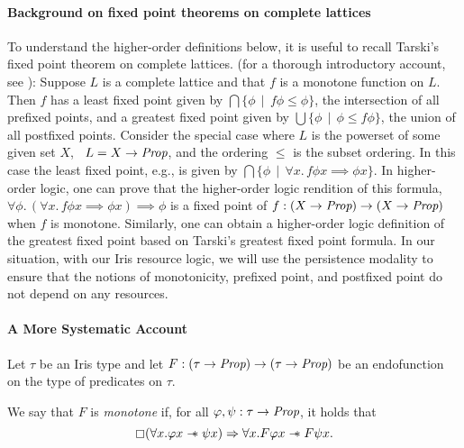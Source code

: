 \paragraph{Background on fixed point theorems on complete lattices}

To understand the higher-order definitions below, it is useful to recall Tarski's fixed point theorem on complete lattices.
(for a thorough introductory account, see \cite{davey-priestley-2002}):
Suppose $L$ is a complete lattice and that $f$ is a monotone function on $L$.
Then $f$ has a least fixed point given by $\bigcap \{ \phi \,\mid\, f \phi \leq \phi \}$,
the intersection of all prefixed points,
and a greatest fixed point given by $\bigcup \{ \phi \,\mid\, \phi \leq f\phi \}$, the union
of all postfixed points.
Consider the special case where $L$ is the powerset of some given set $X$, \ie\ $L = X\to\textit{Prop}$,
and the ordering $\leq$ is the subset ordering. In this case the least fixed point, e.g., is given by
$\bigcap \{ \phi \,\mid\, \forall x.\, f \phi x \implies \phi x \}$.
In higher-order logic, one can prove that the higher-order logic rendition of this formula, \ie\
$\forall \phi.\, (\forall x.\, f \phi x \implies \phi x) \implies \phi$ is a fixed point of
$f: (X\to\textit{Prop})\to(X\to\textit{Prop})$ when $f$ is monotone.
Similarly, one can obtain a higher-order logic definition of the greatest fixed point based on Tarski's
greatest fixed point formula.
In our situation, with our Iris resource logic, 
we will use the persistence modality to
ensure that the notions of monotonicity, prefixed point, and postfixed point do not
depend on any resources. 


\paragraph{A More Systematic Account}


Let $\tau$ be an Iris type and let $F:(\tau\to\textit{Prop})\to(\tau\to\textit{Prop})$ be an endofunction on the type of predicates on $\tau$.

\begin{definition}
  We say that $F$ is \emph{monotone} if, for all $\varphi,\psi: \tau\to\textit{Prop}$, it holds that
  \begin{displaymath}
    \mathop{\boxempty}(\forall x. \varphi x \mathrel{-\!\!\ast} \psi x) \Rightarrow
    \forall x. F \varphi x \mathrel{-\!\!\ast} F \psi x.
  \end{displaymath}
\end{definition}


\newcommand{\lfp}{\operatorname{lfp}}
\newcommand{\gfp}{\operatorname{gfp}}
\newcommand{\grd}{\operatorname{grd}}

